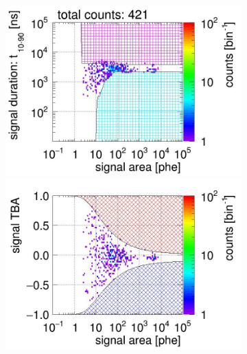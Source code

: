 \begin{landscape}
\begin{figure}[!p]
\begin{subfigure}[t]{0.33\textwidth}
			\caption{}
			\label{fig:signal selection dv 08 03}
		\end{subfigure}
		\begin{subfigure}[t]{0.33\textwidth}
			\centering
			\includegraphics[width=\figurewidth,clip,trim={0 98 0 0}]{Figures/GasTest/CutsValid/res64765/pdpa29Vecfig64765.jpg}
			\includegraphics[width=\figurewidth,clip,trim={0 98 0 40}]{Figures/GasTest/CutsValid/res64765/tbapa29Vecfig64765.jpg}

\end{subfigure}
\end{figure}
\end{landscape}
